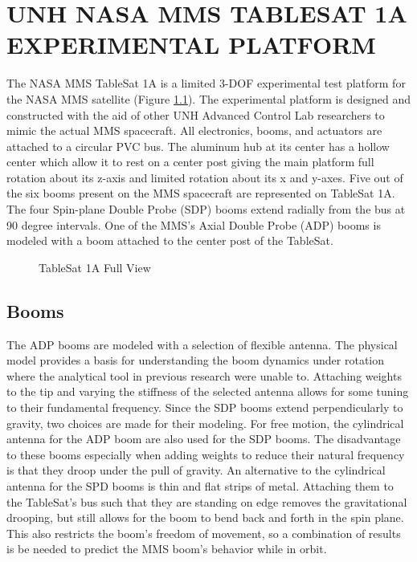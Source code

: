 
\chapter{UNH NASA MMS TABLESAT 1A EXPERIMENTAL PLATFORM}
\label{chap:UNHTableSat1A}

The NASA MMS TableSat 1A is a limited 3-DOF experimental test platform for the NASA MMS satellite (Figure \ref{fig:TSatFullView}).  The experimental platform is designed and constructed with the aid of other UNH Advanced Control Lab researchers to mimic the actual MMS spacecraft.  All electronics, booms, and actuators are attached to a circular PVC bus.  The aluminum hub at its center has a hollow center which allow it to rest on a center post giving the main platform full rotation about its z-axis and limited rotation about its x and y-axes.  Five out of the six booms present on the MMS spacecraft are represented on TableSat 1A.  The four Spin-plane Double Probe (SDP) booms extend radially from the bus at 90 degree intervals.  One of the MMS's Axial Double Probe (ADP) booms is modeled with a boom attached to the center post of the TableSat.

\begin{figure}[ht]
  \centerline{}
  \caption{TableSat 1A Full View}
  \label{fig:TSatFullView}
\end{figure}

\section{Booms}
\label{sec:Booms}

The ADP booms are modeled with a selection of flexible antenna.  The physical model provides a basis for understanding the boom dynamics under rotation where the analytical tool in previous research \cite{mushawehthesis} were unable to.  Attaching weights to the tip and varying the stiffness of the selected antenna allows for some tuning to their fundamental frequency.  Since the SDP booms extend perpendicularly to gravity, two choices are made for their modeling.  For free motion, the cylindrical antenna for the ADP boom are also used for the SDP booms.  The disadvantage to these booms especially when adding weights to reduce their natural frequency is that they droop under the pull of gravity.  An alternative to the cylindrical antenna for the SPD booms is thin and flat strips of metal.  Attaching them to the TableSat's bus such that they are standing on edge removes the gravitational drooping, but still allows for the boom to bend back and forth in the spin plane.  This also restricts the boom's freedom of movement, so a combination of results is be needed to predict the MMS boom's behavior while in orbit.

